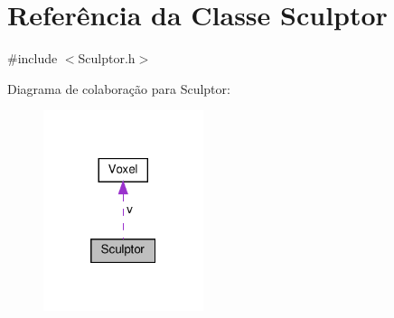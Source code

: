 \hypertarget{classSculptor}{}\section{Referência da Classe Sculptor}
\label{classSculptor}


{\ttfamily \#include $<$Sculptor.\+h$>$}



Diagrama de colaboração para Sculptor\+:\nopagebreak
\begin{figure}[H]
\begin{center}
\leavevmode
\includegraphics[width=133pt]{classSculptor__coll__graph}
\end{center}
\end{figure}
